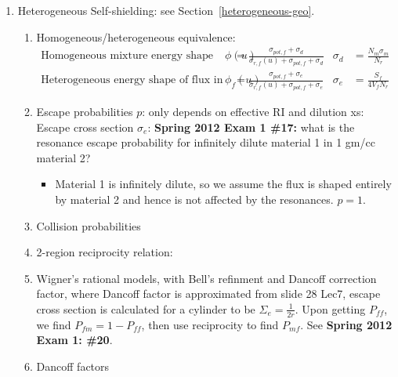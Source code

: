 \documentclass{school-22.211-notes}
\begin{document}
\begin{enumerate}
\item Heterogeneous Self-shielding: see Section~\ref{heterogeneous-geo}.
  \begin{enumerate}
    \item Homogeneous/heterogeneous equivalence: 
      \begin{align*}
        \mbox{Homogeneous mixture energy shape of flux } \phi(u) &= \frac{\sigma_{pot, f} + \sigma_d}{\sigma_{r,f} (u) + \sigma_{pot, f} + \sigma_d}   & \sigma_d &= \frac{N_m \sigma_m}{N_r}  \\
        \mbox{Heterogeneous energy shape of flux in the fuel } \phi_f(u) &= \frac{\sigma_{pot, f} + \sigma_e}{\sigma_{r,f} (u) + \sigma_{pot, f} + \sigma_e}   & \sigma_e &= \frac{S_f}{4 V_f N_r} 
      \end{align*}

    \item Escape probabilities $p$: only depends on effective RI and dilution xs: 
      Escape cross section $\sigma_e$: 
      \textbf{Spring 2012 Exam 1 \#17:} what is the resonance escape probability for infinitely dilute material 1 in 1 gm/cc material 2? 
      \begin{itemize}
        \item Material 1 is infinitely dilute, so we assume the flux is shaped entirely by material 2 and hence is not affected by the resonances. $p = 1$. 
      \end{itemize}

    \item Collision probabilities 

    \item 2-region reciprocity relation:


    \item Wigner's rational models, with Bell's refinment and Dancoff correction factor, 
      where Dancoff factor is approximated from slide 28 Lec7, escape cross section is calculated for a cylinder to be $\Sigma_e = \frac{1}{2r}$.  Upon getting $P_{ff}$, we find $P_{fm} = 1 - P_{ff}$, then use reciprocity to find $P_{mf}$. See \textbf{Spring 2012 Exam 1: \#20}. 

    \item Dancoff factors



\end{enumerate}
\end{enumerate}
\end{document}
